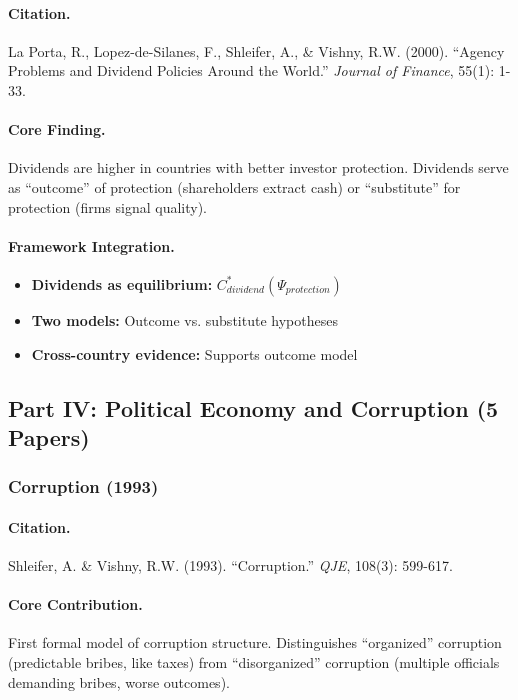 \paragraph{Citation.}
La Porta, R., Lopez-de-Silanes, F., Shleifer, A., \& Vishny, R.W. (2000).
``Agency Problems and Dividend Policies Around the World.''
\emph{Journal of Finance}, 55(1): 1-33.

\paragraph{Core Finding.}
Dividends are higher in countries with better investor protection.
Dividends serve as ``outcome'' of protection (shareholders extract cash)
or ``substitute'' for protection (firms signal quality).

\paragraph{Framework Integration.}
\begin{itemize}
  \item \textbf{Dividends as equilibrium:} $C^*_{dividend}(\Psi_{protection})$
  \item \textbf{Two models:} Outcome vs. substitute hypotheses
  \item \textbf{Cross-country evidence:} Supports outcome model
\end{itemize}

\subsection{Part IV: Political Economy and Corruption (5 Papers)}

\subsubsection{Corruption (1993)}

\paragraph{Citation.}
Shleifer, A. \& Vishny, R.W. (1993).
``Corruption.'' \emph{QJE}, 108(3): 599-617.

\paragraph{Core Contribution.}
First formal model of corruption structure. Distinguishes ``organized''
corruption (predictable bribes, like taxes) from ``disorganized'' corruption
(multiple officials demanding bribes, worse outcomes).


